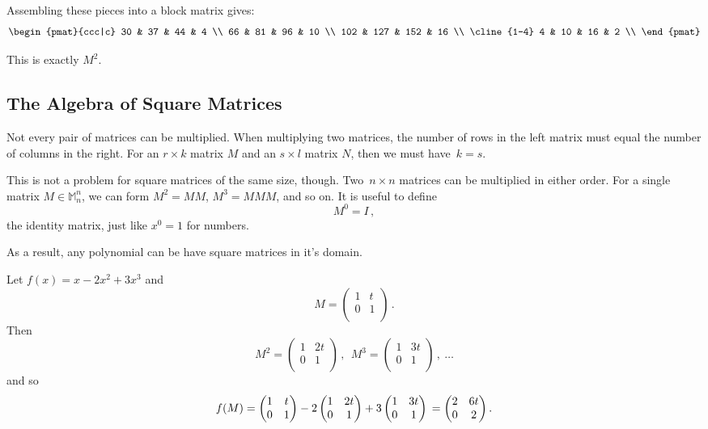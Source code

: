 \begin{itemize}
Assembling these pieces into a block matrix gives:
\[
\begin{pmat}{ccc|c}
30 & 37 & 44 & 4 \\
66 & 81 & 96 & 10 \\
102 & 127 & 152 & 16 \\
\cline{1-4}
4 & 10 & 16 & 2 \\
\end{pmat}
\]

This is exactly $M^2$.
\end{itemize}

\subsection{The Algebra of Square Matrices }

Not every pair of matrices can be multiplied.  When multiplying two matrices, the number of rows in the left matrix must equal the number of columns in the right.  For an $r\times k$ matrix $M$ and an $s\times l$ matrix $N$, then we must have~$k=s$.

This is not a problem for square matrices of the same size, though.  Two~$n\times n$ matrices can be multiplied in either order.  For a single matrix $M \in \mathbb{M}^n_n$, we can form $M^2=MM$, $M^3=MMM$, and so on. It is useful to define \[M^0=I\, ,\] the identity matrix, just like $x^0=1$ for numbers.

As a result, any polynomial  can be have square matrices in it's domain. 

\begin{example}
Let $f(x) = x - 2x^2 + 3x^3$
and \[M=\begin{pmatrix}
1 & t \\
0 & 1 \\
\end{pmatrix}\, .\]  
Then 
\[
M^2 = \begin{pmatrix}
1 & 2t \\
0 & 1 \\
\end{pmatrix}\, ,\:\:
M^3 = \begin{pmatrix}
1 & 3t \\
0 & 1 \\
\end{pmatrix}\, ,\: \ldots
\]
and so 
\[
f(M) = \begin{pmatrix}
	1 & t \\
	0 & 1 
	\end{pmatrix} 
- 2 \begin{pmatrix}
	1 & 2t \\
	0 & 1 
	\end{pmatrix} 
+ 3 \begin{pmatrix}
	1 & 3t \\
	0 & 1 
	\end{pmatrix} \\
= \begin{pmatrix}
	2 & 6t \\
	0 & 2 
	\end{pmatrix}.
\]
\end{example}

